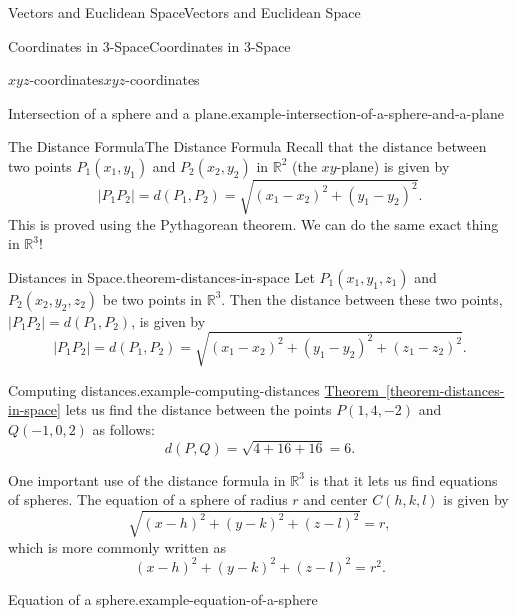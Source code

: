 \documentclass[10pt,]{book}
\numberwithin{equation}{section}
\newcommand{\RR}{\mathbb{R}}
\begin{document}
\begin{chapterptx}{Vectors and Euclidean Space}{}{Vectors and Euclidean Space}{}{}
\begin{sectionptx}{Coordinates in 3-Space}{}{Coordinates in 3-Space}{}{}
\begin{subsectionptx}{\(xyz\)-coordinates}{}{\(xyz\)-coordinates}{}{}
\begin{example}{Intersection of a sphere and a plane.}{example-intersection-of-a-sphere-and-a-plane}
\end{example}
\end{subsectionptx}
%
%
\typeout{************************************************}
\typeout{************************************************}
%
\begin{subsectionptx}{The Distance Formula}{}{The Distance Formula}{}{}\label{subsection-the-distance-formula}
\hypertarget{p-856}{}%
Recall that the distance between two points \(P_{1}(x_{1},y_{1})\) and \(P_{2}(x_{2},y_{2})\) in \(\RR^{2}\) (the \(xy\)-plane) is given by%
%
\begin{equation*}
|P_{1}P_{2}| = d(P_{1},P_{2}) = \sqrt{(x_{1}-x_{2})^{2}+(y_{1}-y_{2})^{2}}.
\end{equation*}
\hypertarget{p-857}{}%
This is proved using the Pythagorean theorem. We can do the same exact thing in \(\RR^{3}\)!%
\begin{theorem}{Distances in Space.}{}{theorem-distances-in-space}%
\hypertarget{p-858}{}%
Let \(P_{1}(x_{1},y_{1},z_{1})\) and \(P_{2}(x_{2},y_{2},z_{2})\) be two points in \(\RR^{3}\). Then the distance between these two points, \(|P_{1}P_{2}| = d(P_{1},P_{2})\), is given by%
\begin{equation*}
|P_{1}P_{2}| = d(P_{1},P_{2}) = \sqrt{(x_{1}-x_{2})^{2}+(y_{1}-y_{2})^{2} + (z_{1}-z_{2})^{2}}.
\end{equation*}
%
\end{theorem}
\begin{example}{Computing distances.}{example-computing-distances}%
\hypertarget{p-859}{}%
\hyperref[theorem-distances-in-space]{Theorem~\ref{theorem-distances-in-space}} lets us find the distance between the points \(P(1,4,-2)\) and \(Q(-1,0,2)\) as follows:%
%
\begin{equation*}
d(P,Q) = \sqrt{4+16+16} = 6.
\end{equation*}
\end{example}
\hypertarget{p-860}{}%
One important use of the distance formula in \(\RR^{3}\) is that it lets us find equations of spheres. The equation of a sphere of radius \(r\) and center \(C(h,k,l)\) is given by%
\begin{equation*}
\sqrt{(x-h)^{2}+(y-k)^{2}+(z-l)^{2}} = r,
\end{equation*}
which is more commonly written as%
\begin{equation*}
(x-h)^{2}+(y-k)^{2}+(z-l)^{2} = r^{2}.
\end{equation*}
%
\begin{example}{Equation of a sphere.}{example-equation-of-a-sphere}%

\end{example}
\end{subsectionptx}
\end{sectionptx}
\end{chapterptx}
\end{document}
